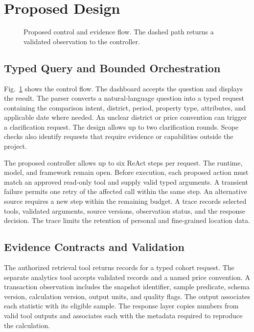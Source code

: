 \section{Proposed Design}
\label{sec:method}

\begin{figure}[t]
\centering

\caption{Proposed control and evidence flow. The dashed path returns a validated observation to the controller.}
\label{fig:architecture}
\end{figure}


\subsection{Typed Query and Bounded Orchestration}
Fig.~\ref{fig:architecture} shows the control flow. The dashboard accepts the question and displays the result. The parser converts a natural-language question into a typed request containing the comparison intent, district, period, property type, attributes, and applicable date where needed. An unclear district or price convention can trigger a clarification request. The design allows up to two clarification rounds. Scope checks also identify requests that require evidence or capabilities outside the project.

The proposed controller allows up to six ReAct steps per request. The runtime, model, and framework remain open. Before execution, each proposed action must match an approved read-only tool and supply valid typed arguments. A transient failure permits one retry of the affected call within the same step. An alternative source requires a new step within the remaining budget. A trace records selected tools, validated arguments, source versions, observation status, and the response decision. The trace limits the retention of personal and fine-grained location data.

\subsection{Evidence Contracts and Validation}
The authorized retrieval tool returns records for a typed cohort request. The separate analytics tool accepts validated records and a named price convention. A transaction observation includes the snapshot identifier, sample predicate, schema version, calculation version, output units, and quality flags. The output associates each statistic with its eligible sample. The response layer copies numbers from valid tool outputs and associates each with the metadata required to reproduce the calculation.

